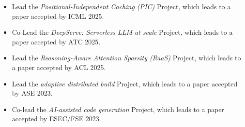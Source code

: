 \begin{small}
\begin{itemize}
\item Lead the \textit{Positional-Independent Caching (PIC)} Project, which leads to a paper accepted by ICML 2025.
\item Co-Lead the \textit{DeepServe: Serverless LLM at scale} Project, which leads to a paper accepted by ATC 2025.
\item Lead the \textit{Reasoning-Aware Attention Sparsity (RaaS)} Project, which leads to a paper accepted by ACL 2025.
\end{itemize}
\end{small}


\begin{small}
\begin{itemize}
\item Lead the \textit{adaptive distributed build} Project, which leads to a paper accepted by ASE 2023.
\item Co-lead the \textit{AI-assisted code generation} Project, which leads to a paper accepted by ESEC/FSE 2023.
\end{itemize}
\end{small}




